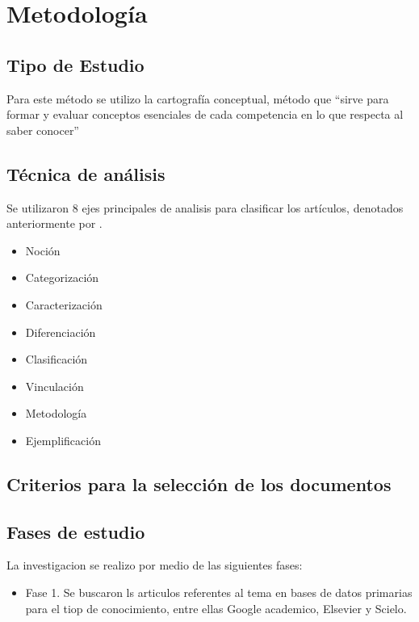 \section{Metodología}
\subsection{Tipo de Estudio}
Para este método se utilizo la cartografía conceptual, método que “sirve para formar y evaluar conceptos esenciales de cada competencia en lo que respecta al saber conocer” \parencite[][p. 16]{tobon2012} 
\subsection{Técnica de análisis}
Se utilizaron 8 ejes principales de analisis para clasificar los artículos, denotados anteriormente por \textcite{tobon2012} .
\begin{itemize}
   \item Noción
   \item Categorización
   \item Caracterización
   \item Diferenciación
   \item Clasificación
   \item Vinculación
   \item Metodología
   \item Ejemplificación
\end{itemize}



\subsection{Criterios para la selección de los documentos}
\subsection{Fases de estudio}

La investigacion se realizo por medio de las siguientes fases:

\begin{itemize}
   \item Fase 1. Se buscaron ls articulos referentes al tema en bases de datos primarias para el tiop de conocimiento, entre ellas Google academico, Elsevier y Scielo.
      
\end{itemize}

%

